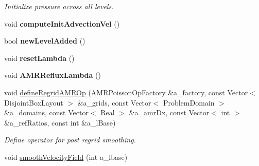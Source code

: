 \begin{DoxyCompactItemize}
\begin{DoxyCompactList}\small\item\em Initialize pressure across all levels. \end{DoxyCompactList}\item 
\hypertarget{class_a_m_r_level_mushy_layer_ab47973fd99a94257b3221d1be16b1bf1}{void {\bfseries compute\-Init\-Advection\-Vel} ()}\label{class_a_m_r_level_mushy_layer_ab47973fd99a94257b3221d1be16b1bf1}

\item 
\hypertarget{class_a_m_r_level_mushy_layer_ad60f55a32e4f04bb5d3ddd101fb4c540}{bool {\bfseries new\-Level\-Added} ()}\label{class_a_m_r_level_mushy_layer_ad60f55a32e4f04bb5d3ddd101fb4c540}

\item 
\hypertarget{class_a_m_r_level_mushy_layer_a28479bc8ab69c855a8d79628cddd5b28}{void {\bfseries reset\-Lambda} ()}\label{class_a_m_r_level_mushy_layer_a28479bc8ab69c855a8d79628cddd5b28}

\item 
\hypertarget{class_a_m_r_level_mushy_layer_a57a9b87c77a7e0aa8b9082dc1a20959d}{void {\bfseries A\-M\-R\-Reflux\-Lambda} ()}\label{class_a_m_r_level_mushy_layer_a57a9b87c77a7e0aa8b9082dc1a20959d}

\item 
\hypertarget{class_a_m_r_level_mushy_layer_a9ea8d57926a8281f053c6277f5b39291}{void \hyperlink{class_a_m_r_level_mushy_layer_a9ea8d57926a8281f053c6277f5b39291}{define\-Regrid\-A\-M\-R\-Op} (A\-M\-R\-Poisson\-Op\-Factory \&a\-\_\-factory, const Vector$<$ Disjoint\-Box\-Layout $>$ \&a\-\_\-grids, const Vector$<$ Problem\-Domain $>$ \&a\-\_\-domains, const Vector$<$ Real $>$ \&a\-\_\-amr\-Dx, const Vector$<$ int $>$ \&a\-\_\-ref\-Ratios, const int \&a\-\_\-l\-Base)}\label{class_a_m_r_level_mushy_layer_a9ea8d57926a8281f053c6277f5b39291}

\begin{DoxyCompactList}\small\item\em Define operator for post regrid smoothing. \end{DoxyCompactList}\item 
\hypertarget{class_a_m_r_level_mushy_layer_a28cfa197f9958818d1e115e92321684d}{void \hyperlink{class_a_m_r_level_mushy_layer_a28cfa197f9958818d1e115e92321684d}{smooth\-Velocity\-Field} (int a\-\_\-lbase)}\label{class_a_m_r_level_mushy_layer_a28cfa197f9958818d1e115e92321684d}


\end{DoxyCompactItemize}
